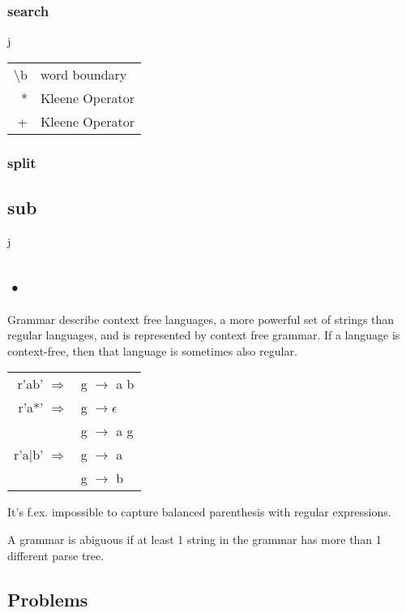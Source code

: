 \documentclass[12pt]{article}
\begin{document}
\subsubsection{search}
j

\begin{tabular}{r | l}
	\textbackslash b & word boundary \\
	* & Kleene Operator \\
	+ & Kleene Operator
\end{tabular}

\subsubsection{split}


\subsection{sub}


j\subsection*{•}

Grammar describe context free languages, a more powerful set of strings than regular languages, and is represented by context free grammar. If a language is context-free, then that language is sometimes also regular.

\begin{tabular}{r l}
	r'ab' $\Rightarrow$ & g $\rightarrow$ a b \\
	r'a*' $\Rightarrow$ & g $\rightarrow \epsilon$ \\
	& g $\rightarrow$ a g \\
	r'a$|$b' $\Rightarrow$ & g $\rightarrow$ a \\
	& g $\rightarrow$ b \\	
\end{tabular}

It's f.ex. impossible to capture balanced parenthesis with regular expressions.

A grammar is abiguous if at least 1 string in the grammar has more than 1 different parse tree.



\subsection{Problems}
\end{document}
